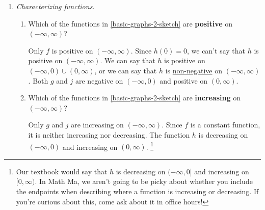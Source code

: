 \documentclass{article}
\begin{document}
\begin{enumerate}
\begin{solution}

  \end{solution}

\item  \label{basic-graphs-2-characterization}

  \emph{Characterizing functions.}
  \begin{enumerate}
  \item


    \begin{problem}[\vfill]
      Which of the functions in \ref{basic-graphs-2-sketch} are \textbf{positive} on $(-\infty, \infty)$?
    \end{problem}

    \begin{solution}
      Only $f$ is positive on $(-\infty,\infty)$. Since $h(0)=0$,
      we can't say that $h$ is positive on $(-\infty, \infty)$.  
      We can say that $h$ is positive on $(-\infty, 0) \cup (0, \infty)$, 
      or we can say that $h$ is \uline{non-negative} on $(-\infty, \infty)$.
      Both $g$ and $j$ are negative on $(-\infty, 0)$ and positive on $(0, \infty)$.
    \end{solution}

  \item
    \begin{problem}[\vfill]
      Which of the functions in \ref{basic-graphs-2-sketch} are \textbf{increasing} on $(-\infty, \infty)$?
    \end{problem}

    \begin{solution}
      Only $g$ and $j$ are increasing on $(-\infty, \infty)$. Since $f$ is a constant function,
      it is neither increasing nor decreasing. 
      The function $h$ is decreasing on $(-\infty,0)$ and
      increasing on $(0,\infty)$.
      \footnote{Our textbook would say that $h$ is decreasing on $(-\infty, 0]$
      and increasing on $[0, \infty)$. In Math Ma, we aren't going to be picky about whether you
      include the endpoints when describing where a function is increasing or decreasing. 
      If you're curious about this, come ask about it in office hours!}
    \end{solution}


\end{enumerate}
\end{enumerate}
\end{document}
